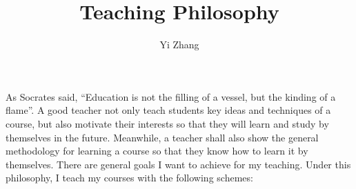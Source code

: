 \documentclass[10pt,a4paper]{article}
\begin{document}
\title{\bf{\Huge{Teaching Philosophy}}}

\author{Yi Zhang}


\date{}
\maketitle

As Socrates said, “Education is not the filling of a vessel, but the kinding of a flame”. 
A good teacher not only teach students key ideas and techniques of a course, but also motivate their interests so that they will learn and 
study by themselves in the future. 
Meanwhile, a teacher shall also show the general methodology for learning a course so that they know how to learn it by themselves. 
There are general goals I want to achieve for my teaching. 
Under this philosophy, I teach my courses with the following schemes: 
\end{document}
